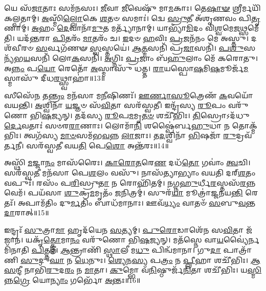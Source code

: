 𑌯𑍇 𑌸᳴\-\ul{𑌜𑌾}\-𑌤𑌾𑌃 𑌸𑌮᳴𑌨𑌸𑌃।
\-\ul{𑌜𑍀}\-𑌵𑌾 \ul{𑌜𑍀}\-𑌵𑍇𑌷𑍁᳴ 𑌮𑌾\-\ul{𑌮}\-𑌕𑌾𑌃।
𑌤𑍇\-\ul{𑌷𑌾}\-\-\ul{𑍟} 𑌶𑍍𑌰𑍀𑌰𑍍𑌮𑌯𑌿᳴ 𑌕𑌲𑍍𑌪𑌤𑌾𑌮𑍍।
\-\ul{𑌅}\-𑌸𑍍𑌮𑌿𑌁\-\ul{𑌲𑍍𑌲𑍋}\-𑌕𑍇 \ul{𑌶}\-𑌤𑍞 𑌸𑌮𑌾𑌃॑।
𑌦𑍍𑌵𑍇 \ul{𑌸𑍍𑌰𑍁}\-𑌤𑍀 𑌅᳴𑌶𑍃𑌣𑌵𑌂 𑌪𑌿\-\ul{𑌤𑍃}\-𑌣𑌾𑌮𑍍।
\-\ul{𑌅}\-𑌹𑌂 \ul{𑌦𑍇}\-𑌵𑌾𑌨𑌾᳴\-\ul{𑌮𑍁}\-𑌤 𑌮𑌰𑍍𑌤𑍍𑌯𑌾᳴𑌨𑌾𑌮𑍍।
𑌯𑌾𑌭𑍍𑌯𑌾᳴\-\ul{𑌮𑌿}\-𑌦𑌂 𑌵𑌿\-\ul{𑌶𑍍𑌵}\-𑌮𑍇\-\ul{𑌜}\-𑌥𑍍𑌸𑌮𑍇᳴𑌤𑌿।
𑌯𑌦᳴\-\ul{𑌨𑍍𑌤}\-𑌰𑌾 \ul{𑌪𑌿}\-𑌤𑌰𑌂᳴ \ul{𑌮𑌾}\-𑌤𑌰𑌂᳴ 𑌚।
\-\ul{𑌇}\-𑌦𑍞 \ul{𑌹}\-𑌵𑌿𑌃 \ul{𑌪𑍍𑌰}\-𑌜𑌨᳴𑌨𑌂 𑌮𑍇 𑌅𑌸𑍍𑌤𑍁।
𑌦𑌶᳴𑌵𑍀𑌰𑍞 \ul{𑌸}\-𑌰𑍍𑌵𑌗᳴𑌣𑍟 \ul{𑌸𑍍𑌵}\-𑌸𑍍𑌤𑌯𑍇॑।
\-\ul{𑌆}\-\-\ul{𑌤𑍍𑌮}\-𑌸𑌨𑌿᳴ 𑌪𑍍𑌰\-\ul{𑌜𑌾}\-𑌸𑌨𑌿᳴।
\-\ul{𑌪}\-\-\ul{𑌶𑍁}\-𑌸𑌨𑍍𑌯᳴𑌭\-\ul{𑌯}\-𑌸𑌨𑌿᳴ 𑌲𑍋\-\ul{𑌕}\-𑌸𑌨𑌿᳴।
\-\ul{𑌅}\-𑌗𑍍𑌨𑌿𑌃 \ul{𑌪𑍍𑌰}\-𑌜𑌾𑌂 𑌬᳴\-\ul{𑌹𑍁}\-𑌲𑌾𑌂 𑌮𑍇᳴ 𑌕𑌰𑍋𑌤𑍁।
𑌅\-\ul{𑌨𑍍𑌨𑌂} 𑌪\-\ul{𑌯𑍋} 𑌰𑍇𑌤𑍋᳴ \ul{𑌅}\-𑌸𑍍𑌮𑌾𑌸𑍁᳴ 𑌧𑌤𑍍𑌤।
\-\ul{𑌰𑌾}\-𑌯𑌸𑍍𑌪𑍋\-\ul{𑌷}\-𑌮𑌿\-\ul{𑌷}\-𑌮𑍂𑌰𑍍𑌜᳴\-\ul{𑌮}\-𑌸𑍍𑌮𑌾𑌸𑍁᳴ 𑌦𑍀𑌧\-\ul{𑌰}\-𑌥𑍍𑌸𑍍𑌵𑌾𑌹𑌾॑॥13॥\anuvakamend[\-\ul{𑌇}\-\-\ul{𑌨𑍍𑌦𑍍𑌰𑌿}\-𑌯𑌾𑌯᳴ \ul{𑌪𑌿}\-𑌤𑌰𑌃᳴ \ul{𑌶}\-𑌤𑌾𑌯𑍁᳴𑌷𑌾 \ul{𑌪𑍁}\-𑌨𑌨𑍍𑌤𑍁᳴ 𑌮𑌾 𑌪𑌿𑌤𑌾\-\ul{𑌮}\-𑌹𑌾𑌃 \ul{𑌪𑍁}\-𑌨\-\ul{𑌨𑍍𑌤𑍁} 𑌪𑍍𑌰𑌪𑌿᳴𑌤𑌾𑌮𑌹𑌾𑌃 𑌕𑌲𑍍𑌪𑌤𑌾𑍟 \ul{𑌸𑍍𑌵}\-𑌸𑍍𑌤\-\ul{𑌯𑍇} 𑌪𑌞𑍍𑌚᳴ 𑌚]

𑌸𑍀𑌸𑍇᳴\-\ul{𑌨} 𑌤\-\ul{𑌨𑍍𑌤𑍍𑌰𑌂} 𑌮𑌨᳴𑌸𑌾 𑌮\-\ul{𑌨𑍀}\-𑌷𑌿𑌣𑌃᳴।
\-\ul{𑌊}\-\-\ul{𑌰𑍍𑌣𑌾}\-\-\ul{𑌸𑍂}\-𑌤𑍍𑌰𑍇𑌣᳴ \ul{𑌕}\-𑌵𑌯𑍋᳴ 𑌵𑌯𑌨𑍍𑌤𑌿।
\-\ul{𑌅}\-𑌶𑍍𑌵𑌿𑌨𑌾᳴ \ul{𑌯}\-𑌜𑍍𑌞𑍞 𑌸᳴\-\ul{𑌵𑌿}\-𑌤𑌾 𑌸𑌰᳴𑌸𑍍𑌵𑌤𑍀।
𑌇𑌨𑍍𑌦𑍍𑌰᳴𑌸𑍍𑌯 \ul{𑌰𑍂}\-𑌪𑌂 𑌵𑌰𑍁᳴𑌣𑍋 𑌭𑌿\-\ul{𑌷}\-𑌜𑍍𑌯𑌨𑍍।
𑌤𑌦᳴𑌸𑍍𑌯 \ul{𑌰𑍂}\-𑌪\-\ul{𑌮}\-𑌮𑍃\-\ul{𑌤}\-\-\ul{𑍞} 𑌶𑌚𑍀᳴𑌭𑌿𑌃।
\-\ul{𑌤𑌿}\-𑌸𑍍𑌰𑍋\-𑌽𑌦᳴𑌧𑍁\-\ul{𑌰𑍍𑌦𑍇}\-𑌵𑌤𑌾𑌃॑ 𑌸𑍞𑌰\-\ul{𑌰𑌾}\-𑌣𑌾𑌃।
𑌲𑍋𑌮𑌾᳴\-\ul{𑌨𑌿} 𑌶𑌷𑍍𑌪𑍈॑𑌰𑍍𑌬\-\ul{𑌹𑍁}\-𑌧𑌾 𑌨 𑌤𑍋𑌕𑍍𑌮᳴𑌭𑌿𑌃।
𑌤𑍍𑌵𑌗᳴𑌸𑍍𑌯 \ul{𑌮𑌾}\-\-\ul{𑍞}\-𑌸𑌮᳴𑌭\-\ul{𑌵}\-𑌨𑍍𑌨 \ul{𑌲𑌾}\-𑌜𑌾𑌃।
𑌤\-\ul{𑌦}\-𑌶𑍍𑌵𑌿𑌨𑌾᳴ \ul{𑌭𑌿}\-𑌷𑌜𑌾᳴ \ul{𑌰𑍁}\-𑌦𑍍𑌰𑌵᳴𑌰𑍍𑌤𑌨𑍀।
𑌸𑌰᳴𑌸𑍍𑌵𑌤𑍀 𑌵𑌯\-\ul{𑌤𑌿} 𑌪𑍇\-\ul{𑌶𑍋} 𑌅𑌨𑍍𑌤᳴𑌰𑌃॥14॥

𑌅𑌸𑍍𑌥𑌿᳴ \ul{𑌮}\-𑌜𑍍𑌜𑌾\-\ul{𑌨𑌂} 𑌮𑌾𑌸᳴𑌰𑍈𑌃।
\-\ul{𑌕𑌾}\-\-\ul{𑌰𑍋}\-\-\ul{𑌤}\-𑌰𑍇\-\ul{𑌣} 𑌦𑌧᳴\-\ul{𑌤𑍋} 𑌗𑌵𑌾𑌂॑ \ul{𑌤𑍍𑌵}\-𑌚𑌿।
𑌸𑌰᳴𑌸𑍍𑌵\-\ul{𑌤𑍀} 𑌮𑌨᳴𑌸𑌾 𑌪𑍇\-\ul{𑌶}\-𑌲𑌂 𑌵𑌸𑍁᳴।
𑌨𑌾𑌸᳴𑌤𑍍𑌯𑌾𑌭𑍍𑌯𑌾𑌂 𑌵𑌯𑌤𑌿 𑌦𑌰𑍍‌\mbox{}\-\ul{𑌶}\-𑌤𑌂 𑌵𑌪𑍁𑌃᳴।
𑌰𑌸𑌂᳴ 𑌪\-\ul{𑌰𑌿}\-𑌸𑍍𑌰𑍁\-\ul{𑌤𑌾} 𑌨 𑌰𑍋𑌹𑌿᳴𑌤𑌮𑍍।
\-\ul{𑌨}\-𑌗𑍍𑌨\-\ul{𑌹𑍁}\-𑌰𑍍𑌧𑍀\-\ul{𑌰}\-𑌸𑍍𑌤𑌸᳴\-\ul{𑌰}\-𑌨𑍍𑌨 𑌵𑍇𑌮᳴।
𑌪𑌯᳴𑌸𑌾 \ul{𑌶𑍁}\-𑌕𑍍𑌰\-\ul{𑌮}\-𑌮𑍃𑌤𑌂᳴ \ul{𑌜}\-𑌨𑌿𑌤𑍍𑌰𑌮𑍍॑।
𑌸𑍁𑌰᳴\-\ul{𑌯𑌾} 𑌮𑍂𑌤𑍍𑌰𑌾॑𑌜𑍍𑌜𑌨𑌯\-\ul{𑌨𑍍𑌤𑌿} 𑌰𑍇𑌤𑌃᳴।
𑌅𑌪𑌾𑌮᳴𑌤𑌿𑌂 𑌦𑍁\-\ul{𑌰𑍍𑌮}\-𑌤𑌿𑌂 𑌬𑌾𑌧᳴𑌮𑌾𑌨𑌾𑌃।
𑌊𑌵᳴\-\ul{𑌧𑍍𑌯𑌂} 𑌵𑌾𑌤𑍞᳴ \ul{𑌸}\-𑌬𑍁\-\ul{𑌵}\-𑌨𑍍𑌤\-\ul{𑌦𑌾}\-𑌰𑌾𑌤𑍍॥15॥

𑌇𑌨𑍍𑌦𑍍𑌰𑌃᳴ \ul{𑌸𑍁}\-𑌤𑍍𑌰𑌾\-\ul{𑌮𑌾} 𑌹𑍃𑌦᳴𑌯𑍇𑌨 \ul{𑌸}\-𑌤𑍍𑌯𑌮𑍍।
\-\ul{𑌪𑍁}\-\-\ul{𑌰𑍋}\-𑌡𑌾𑌶𑍇᳴𑌨 𑌸\-\ul{𑌵𑌿}\-𑌤𑌾 𑌜᳴𑌜𑌾𑌨।
𑌯𑌕𑍃᳴\-\ul{𑌤𑍍𑌕𑍍𑌲𑍋}\-𑌮𑌾\-\ul{𑌨𑌂} 𑌵𑌰𑍁᳴𑌣𑍋 𑌭𑌿\-\ul{𑌷}\-𑌜𑍍𑌯𑌨𑍍।
𑌮𑌤᳴𑌸𑍍𑌨𑍇 𑌵𑌾\-\ul{𑌯}\-𑌵𑍍𑌯𑍈॑𑌰𑍍𑌨 𑌮𑌿᳴𑌨𑌾𑌤𑌿 \ul{𑌪𑌿}\-𑌤𑍍𑌤𑌮𑍍।
\-\ul{𑌆}\-𑌨𑍍𑌤𑍍𑌰𑌾𑌣𑌿᳴ \ul{𑌸𑍍𑌥𑌾}\-𑌲𑍀 𑌮\-\ul{𑌧𑍁} 𑌪𑌿𑌨𑍍𑌵᳴𑌮𑌾𑌨𑌾।
𑌗𑍁\-\ul{𑌦𑌾} 𑌪𑌾𑌤𑍍𑌰𑌾᳴𑌣𑌿 \ul{𑌸𑍁}\-𑌦𑍁\-\ul{𑌘𑌾} 𑌨 \ul{𑌧𑍇}\-𑌨𑍁𑌃।
\-\ul{𑌶𑍍𑌯𑍇}\-𑌨\-\ul{𑌸𑍍𑌯} 𑌪\-\ul{𑌤𑍍𑌰𑌂} 𑌨 \ul{𑌪𑍍𑌲𑍀}\-𑌹𑌾 𑌶𑌚𑍀᳴𑌭𑌿𑌃।
\-\ul{𑌆}\-\-\ul{𑌸}\-𑌨𑍍𑌦𑍀 𑌨𑌾𑌭𑌿᳴\-\ul{𑌰𑍁}\-𑌦\-\ul{𑌰𑌂} 𑌨 \ul{𑌮𑌾}\-𑌤𑌾।
\-\ul{𑌕𑍁}\-𑌮𑍍𑌭𑍋 𑌵᳴\-\ul{𑌨𑌿}\-𑌷𑍍𑌠𑍁𑌰𑍍𑌜᳴\-\ul{𑌨𑌿}\-𑌤𑌾 𑌶𑌚𑍀᳴𑌭𑌿𑌃।
𑌯\-\ul{𑌸𑍍𑌮𑌿}\-𑌨𑍍𑌨\-\ul{𑌗𑍍𑌰𑍇} 𑌯𑍋\-\ul{𑌨𑍍𑌯𑌾𑌂} 𑌗𑌰𑍍𑌭𑍋᳴ \ul{𑌅}\-𑌨𑍍𑌤𑌃॥16॥

